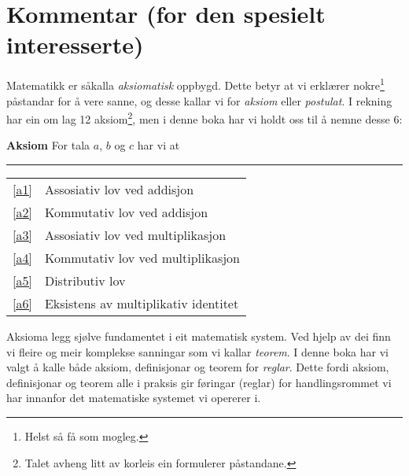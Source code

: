 



	
\section*{Kommentar (for den spesielt interesserte) \label{Kommentar1}}
Matematikk er såkalla \textit{aksiomatisk} oppbygd. Dette betyr at vi erklærer nokre\footnote{Helst så få som mogleg.} påstandar for å vere sanne, og desse kallar vi for \textit{aksiom} eller \textit{postulat}. I rekning har ein om lag 12 aksiom\footnote{Talet avheng litt av korleis ein formulerer påstandane.}, men i denne boka har vi holdt oss til å nemne desse 6:
\regv 

\begin{tcolorbox}[boxrule=0.3 mm,arc=0mm,colback=blue!5] {\large \textbf{Aksiom} \vspace{5 pt}}\newline
For tala $ a $, $ b $ og $ c $ har vi at
\rule{1\linewidth}{0.75bp}
\begin{center}
	\begin{tabular}{rl}
		\eqref{a1} &Assosiativ lov ved addisjon\\
		\eqref{a2} & Kommutativ lov ved addisjon \\	
		\eqref{a3} & Assosiativ lov ved multiplikasjon \\
		\eqref{a4} & Kommutativ lov ved multiplikasjon \\		
		\eqref{a5} & Distributiv lov\\	
		\eqref{a6} & Eksistens av multiplikativ identitet
	\end{tabular}
\end{center}
\end{tcolorbox}
\vsk
Aksioma legg sjølve fundamentet i eit matematisk system. Ved hjelp av dei finn vi fleire og meir komplekse sanningar som vi kallar \textit{teorem}. I denne boka har vi valgt å kalle både aksiom, definisjonar og teorem for \textsl{reglar}. Dette fordi aksiom, definisjonar og teorem alle i praksis gir føringar (reglar) for handlingsrommet vi har innanfor det matematiske systemet vi opererer i.\vsk
